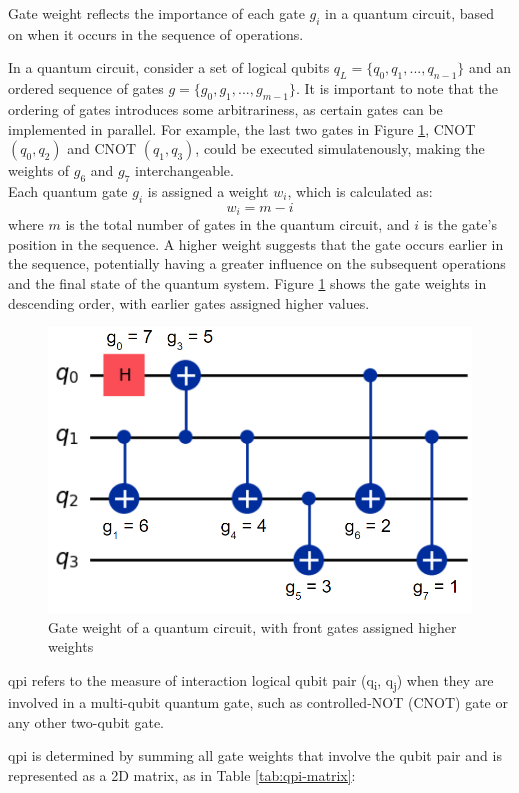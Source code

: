 \begin{definition} %
    Gate weight reflects the importance of each gate $g_i$ in a quantum circuit, based on when it occurs in the sequence of operations.
\end{definition}
In a quantum circuit, consider a set of logical qubits $q_L = \{q_0, q_1, ..., q_{n-1}\}$ and an ordered sequence of gates $g = \{g_0, g_1, ..., g_{m-1}\}$. It is important to note that the ordering of gates introduces some arbitrariness, as certain gates can be implemented in parallel. For example, the last two gates in Figure \ref{fig:gate-weight}, CNOT $(q_0, q_2)$ and CNOT $(q_1, q_3)$, could be executed simulatenously, making the weights of $g_6$ and $g_7$ interchangeable. \\
Each quantum gate $g_i$ is assigned a weight $w_i$, which is calculated as:
\begin{equation}
    w_i = m - i
\end{equation}
where $m$ is the total number of gates in the quantum circuit, and $i$ is the gate's position in the sequence. A higher weight suggests that the gate occurs earlier in the sequence, potentially having a greater influence on the subsequent operations and the final state of the quantum system. Figure \ref{fig:gate-weight} shows the gate weights in descending order, with earlier gates assigned higher values.
\begin{figure}[h]
    \centering
    \includegraphics[width=0.4\linewidth]{image/gate_weight.png}
    \caption{Gate weight of a quantum circuit, with front gates assigned higher weights}
    \label{fig:gate-weight}
\end{figure}
\begin{definition}
    \acrfull{qpi} refers to the measure of interaction logical qubit pair (q\textsubscript{i}, q\textsubscript{j}) when they are involved in a multi-qubit quantum gate, such as controlled-NOT (CNOT) gate or any other two-qubit gate.
\end{definition}
\acrshort{qpi} is determined by summing all gate weights that involve the qubit pair and is represented as a 2D matrix, as in Table \ref{tab:qpi-matrix}:

